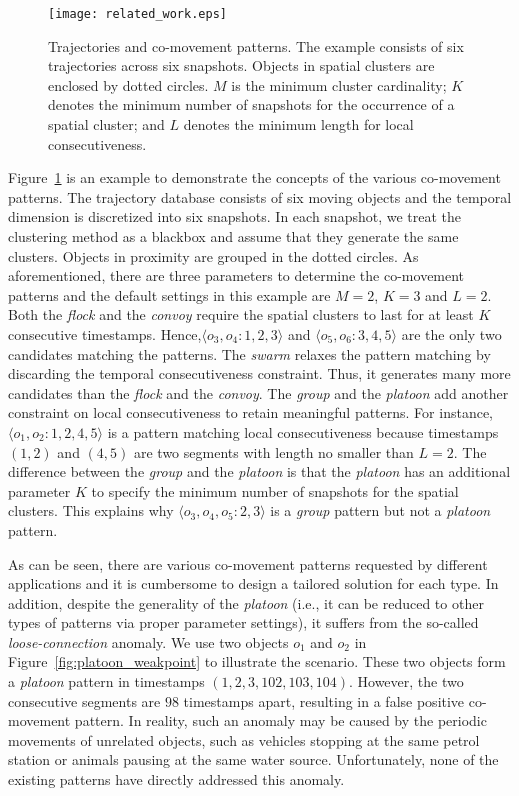 \begin{figure}[h]
\centering
\texttt{[image: related\_work.eps]}
\caption{Trajectories and co-movement patterns. The example consists of six trajectories across six snapshots. Objects in spatial clusters are enclosed by dotted circles. $M$ is the minimum cluster cardinality; $K$ denotes the minimum number of snapshots for the occurrence of a spatial cluster; and $L$ denotes the minimum length for local consecutiveness.}
\label{fig:related_work}
\end{figure}

\vspace{-2mm}
Figure~\ref{fig:related_work} is an example to demonstrate the concepts of the various co-movement patterns. The trajectory database consists of six moving objects and the temporal dimension is discretized into six snapshots. In each snapshot, we treat the clustering method as a blackbox and assume that they generate the same clusters. Objects in proximity are grouped in the dotted circles. As aforementioned, there are three parameters to determine the co-movement patterns and the default settings in this example are $M=2$, $K=3$ and $L=2$. Both the \emph{flock} and the \emph{convoy} require the spatial clusters to last for at least $K$ consecutive  timestamps. Hence,$\langle o_3,o_4:1,2,3 \rangle$ and $\langle o_5,o_6:3,4,5 \rangle$  are the only two candidates matching the patterns. The \textit{swarm} relaxes the pattern matching by discarding the temporal consecutiveness constraint. Thus, it generates many more candidates than the \textit{flock} and the \textit{convoy}. The \textit{group} and the \textit{platoon} add another constraint on local consecutiveness to retain meaningful patterns. For instance, $\langle o_1,o_2:1,2,4,5 \rangle$ is a pattern matching local consecutiveness because timestamps $(1,2)$ and $(4,5)$ are two segments with length no smaller than $L=2$. The difference between the \textit{group} and the \textit{platoon} is that the \textit{platoon} has an additional parameter $K$ to specify the minimum number of snapshots for the spatial clusters. This explains why $\langle o_3,o_4,o_5:2,3 \rangle$ is a  \textit{group} pattern but not a \textit{platoon} pattern.

As can be seen, there are various co-movement patterns requested by different applications and it is cumbersome to design a tailored solution for each type. In addition, despite the generality of the \emph{platoon} (i.e., it can be reduced to other types of patterns via proper parameter settings), it suffers from the so-called \emph{loose-connection} anomaly. We use two objects $o_1$ and $o_2$ in Figure~\ref{fig:platoon_weakpoint} to illustrate the scenario. These two objects form a \emph{platoon} pattern in timestamps $(1,2,3,102,103,104)$. However, the two consecutive segments are $98$ timestamps apart, resulting in a false positive co-movement pattern. In reality, such an anomaly may be caused  by the periodic movements of unrelated objects, such as vehicles stopping at the same petrol station or animals pausing at the same water source. 
Unfortunately, none of the existing patterns have directly addressed this anomaly.

